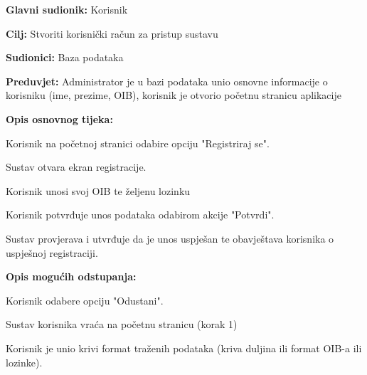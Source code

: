 					\noindent {}
					\begin{packed_item}
	
						\item \textbf{Glavni sudionik: }Korisnik
						\item  \textbf{Cilj:} Stvoriti korisnički račun za pristup sustavu
						\item  \textbf{Sudionici:} Baza podataka
						\item  \textbf{Preduvjet:} Administrator je u bazi podataka unio osnovne informacije o korisniku (ime, prezime, OIB), korisnik je otvorio početnu stranicu aplikacije
						\item  \textbf{Opis osnovnog tijeka:}
						
						\item[] \begin{packed_enum}
	
							\item Korisnik na početnoj stranici odabire opciju "Registriraj se".
							\item Sustav otvara ekran registracije.
							\item Korisnik unosi svoj OIB te željenu lozinku
							\item Korisnik potvrđuje unos podataka odabirom akcije "Potvrdi".
							\item Sustav provjerava i utvrđuje da je unos uspješan te obavještava korisnika o uspješnoj registraciji.
						\end{packed_enum}
						
						\item  \textbf{Opis mogućih odstupanja:}
						
						\item[] \begin{packed_item}
	
							\item[4.a] Korisnik odabere opciju "Odustani".
							\item[] \begin{packed_enum}
								
								\item Sustav korisnika vraća na početnu stranicu (korak 1)
								
								
							\end{packed_enum}
							
							\item[5.a] Korisnik je unio krivi format traženih podataka (kriva duljina ili format OIB-a ili lozinke).
							\item[] \begin{packed_enum}
								

\end{packed_enum}
\end{packed_item}
\end{packed_item}
